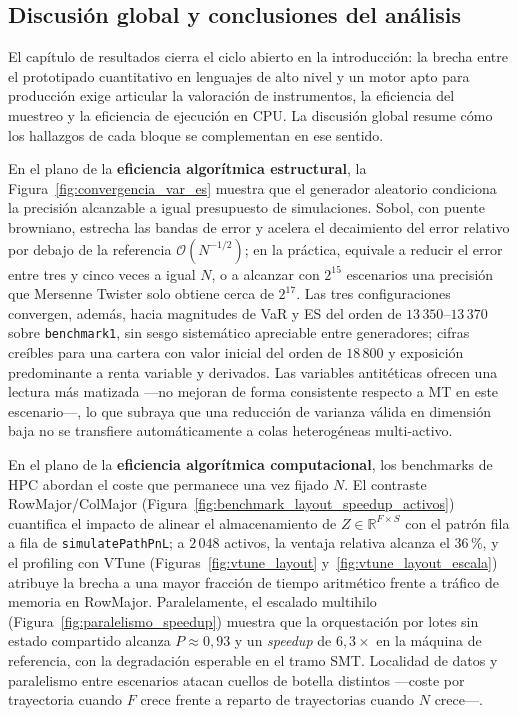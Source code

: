 \documentclass[11pt]{article}
\begin{document}
\subsection{Discusión global y conclusiones del análisis}

El capítulo de resultados cierra el ciclo abierto en la introducción: la brecha entre el prototipado cuantitativo en lenguajes de alto nivel y un motor apto para producción exige articular la valoración de instrumentos, la eficiencia del muestreo y la eficiencia de ejecución en CPU.
La discusión global resume cómo los hallazgos de cada bloque se complementan en ese sentido.

En el plano de la \textbf{eficiencia algorítmica estructural}, la Figura~\ref{fig:convergencia_var_es} muestra que el generador aleatorio condiciona la precisión alcanzable a igual presupuesto de simulaciones.
Sobol, con puente browniano, estrecha las bandas de error y acelera el decaimiento del error relativo por debajo de la referencia $\mathcal{O}(N^{-1/2})$; en la práctica, equivale a reducir el error entre tres y cinco veces a igual $N$, o a alcanzar con $2^{15}$ escenarios una precisión que Mersenne Twister solo obtiene cerca de $2^{17}$.
Las tres configuraciones convergen, además, hacia magnitudes de VaR y ES del orden de $13\,350$--$13\,370$ sobre \texttt{benchmark1}, sin sesgo sistemático apreciable entre generadores; cifras creíbles para una cartera con valor inicial del orden de $18\,800$ y exposición predominante a renta variable y derivados.
Las variables antitéticas ofrecen una lectura más matizada ---no mejoran de forma consistente respecto a MT en este escenario---, lo que subraya que una reducción de varianza válida en dimensión baja no se transfiere automáticamente a colas heterogéneas multi-activo.

En el plano de la \textbf{eficiencia algorítmica computacional}, los benchmarks de HPC abordan el coste que permanece una vez fijado $N$.
El contraste RowMajor/ColMajor (Figura~\ref{fig:benchmark_layout_speedup_activos}) cuantifica el impacto de alinear el almacenamiento de $Z \in \mathbb{R}^{F \times S}$ con el patrón fila a fila de \texttt{simulatePathPnL}; a $2\,048$ activos, la ventaja relativa alcanza el $36\,\%$, y el profiling con VTune (Figuras~\ref{fig:vtune_layout} y~\ref{fig:vtune_layout_escala}) atribuye la brecha a una mayor fracción de tiempo aritmético frente a tráfico de memoria en RowMajor.
Paralelamente, el escalado multihilo (Figura~\ref{fig:paralelismo_speedup}) muestra que la orquestación por lotes sin estado compartido alcanza $P \approx 0{,}93$ y un \emph{speedup} de $6{,}3\times$ en la máquina de referencia, con la degradación esperable en el tramo SMT.
Localidad de datos y paralelismo entre escenarios atacan cuellos de botella distintos ---coste por trayectoria cuando $F$ crece frente a reparto de trayectorias cuando $N$ crece---.
\end{document}
